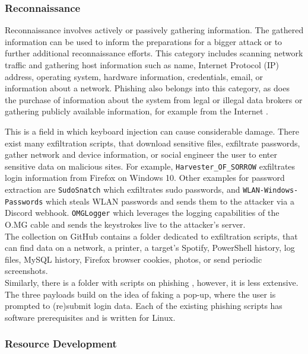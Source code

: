 \subsubsection{Reconnaissance}

Reconnaissance involves actively or passively gathering information. The gathered information can be used to inform the preparations
for a bigger attack or to further additional reconnaissance efforts. This category includes scanning network traffic and gathering host information such as name, Internet Protocol (IP) address, operating system,
hardware information, credentials, email, or information about a network. Phishing also belongs into this category, as does the purchase of information about the system from legal or illegal data brokers or gathering publicly available information, for example from the Internet \cite{MITREATTCK}.

This is a field in which keyboard injection can cause considerable damage. There exist many exfiltration scripts, that download sensitive files, exfiltrate passwords, gather network and device information, or social engineer the user to enter sensitive data on malicious sites.
For example, \verb|Harvester_OF_SORROW| \cite{OmgpayloadsPayloadsLibrary} exfiltrates login information from Firefox on Windows 10. Other examples for password extraction are \verb|SudoSnatch| \cite{OmgpayloadsPayloadsLibrary} which exfiltrates sudo passwords, and \verb|WLAN-Windows-Passwords| \cite{OmgpayloadsPayloadsLibrary} which steals WLAN passwords and sends them to the attacker via a Discord webhook. 
\verb|OMGLogger| \cite{OmgpayloadsPayloadsLibrary} which leverages the logging capabilities of the O.MG cable and sends the keystrokes live to the attacker's server. \\
The collection on GitHub contains a folder dedicated to exfiltration scripts, that can find data on a network, a printer, a target's Spotify, PowerShell history, log files, MySQL history,
Firefox browser cookies, photos, or send periodic screenshots. \\
Similarly, there is a folder with scripts on phishing  \cite{OmgpayloadsPayloadsLibrary}, however, it is less extensive. The three payloads build on the idea of faking a pop-up,
where the user is prompted to (re)submit login data. Each of the existing phishing scripts has software prerequisites and is written for Linux. \\


\subsubsection{Resource Development}

